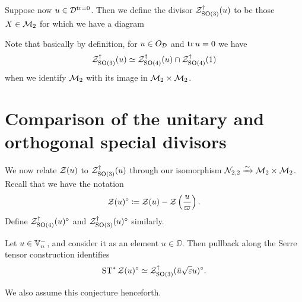 \begin{definition}
  Suppose now $u \in \mathcal D^{\operatorname{tr} = 0}$.
  Then we define the divisor $\mathcal Z^{\dagger}_{\operatorname{SO}(3)}(u)$ to be those $X \in \mathcal M_2$
  for which we have a diagram
  \begin{center}
  \end{center}
  Note that basically by definition, for $u \in O_\mathcal D$ and $\operatorname{tr} u = 0$ we have
  \[ \mathcal Z^{\dagger}_{\operatorname{SO}(3)}(u) \simeq \mathcal Z^{\dagger}_{\operatorname{SO}(4)}(u) \cap \mathcal Z^{\dagger}_{\operatorname{SO}(4)}(1) \]
  when we identify $\mathcal M_2$ with its image in $\mathcal M_2 \times \mathcal M_2$.
\end{definition}

\section{Comparison of the unitary and orthogonal special divisors}
We now relate $\mathcal Z(u)$ to $\mathcal Z^{\dagger}_{\operatorname{SO}(3)}(u)$ through our
isomorphism $\mathcal N_{2,2} \xrightarrow{\sim} \mathcal M_2 \times \mathcal M_2$.
Recall that we have the notation
\[ \mathcal Z(u)^\circ \coloneqq \mathcal Z(u) - \mathcal Z\left( \frac{u}{\varpi} \right). \]
Define $\mathcal Z^{\dagger}_{\operatorname{SO}(4)}(u)^\circ$ and $\mathcal Z^{\dagger}_{\operatorname{SO}(3)}(u)^\circ$ similarly.

\begin{conjecture}
  \label{conj:serre_pullback_divisor}
  Let $u \in \mathbb V_n^-$, and consider it as an element $u \in \DD$.
  Then pullback along the Serre tensor construction identifies
  \[ \operatorname{ST}^\ast \mathcal Z(u)^\circ \simeq \mathcal Z^{\dagger}_{\operatorname{SO}(3)}(\bar u \sqrt{\varepsilon} u)^\circ. \]
\end{conjecture}
We also assume this conjecture henceforth.

